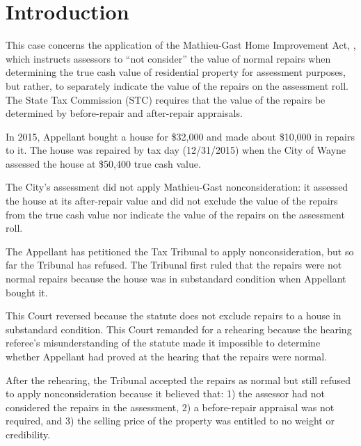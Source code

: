 \documentclass[12pt,\documentclassflag]{michiganCourtOfAppealsBrief}
\begin{document}
\newpage 
\section{Introduction}

This case concerns the application of the Mathieu-Gast Home Improvement Act, \cite[s]{MCL 211.27(2)}, which instructs assessors to ``not consider'' the value of normal repairs when determining the true cash value of residential property for assessment purposes, but rather, to separately indicate the value of the repairs on the assessment roll.
The State Tax Commission (STC) requires that the value of the repairs be determined by before-repair and after-repair appraisals.

In 2015, Appellant bought a house for \$32,000 and made about \$10,000 in repairs to it. The house was repaired by tax day (12/31/2015) when the City of Wayne assessed the house at \$50,400 true cash value.

The City's assessment did not apply Mathieu-Gast nonconsideration: it assessed the house at its after-repair value and did not exclude the value of the repairs from the true cash value nor indicate the value of the repairs on the assessment roll.

The Appellant has petitioned the Tax Tribunal to apply nonconsideration, but so far the Tribunal has refused. The Tribunal first ruled that the repairs were not normal repairs because the house was in substandard condition when Appellant bought it.

This Court reversed because the statute does not exclude repairs to a house in substandard condition.
This Court remanded for a rehearing because the hearing referee's misunderstanding of the statute made it impossible to determine whether Appellant had proved at the hearing that the repairs were normal.

After the rehearing, the Tribunal accepted the repairs as normal but still refused to apply nonconsideration because it believed that:
1) the assessor had not considered the repairs in the assessment,
2) a before-repair appraisal was not required, and
3) the selling price of the property was entitled to no weight or credibility.

\end{document}
